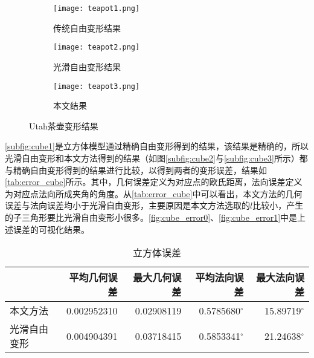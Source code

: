 \begin{figure}[htbp]
	\centering
	\begin{subfigure}[b]{.3\textwidth}
		\centering
		\texttt{[image: teapot1.png]}
		\caption{传统自由变形结果}\label{subfig:teapot1}
	\end{subfigure}
	\begin{subfigure}[b]{.3\textwidth}
		\centering
		\texttt{[image: teapot2.png]}
		\caption{光滑自由变形结果}\label{subfig:teapot2}
	\end{subfigure}
	\begin{subfigure}[b]{.3\textwidth}
		\centering
		\texttt{[image: teapot3.png]}
		\caption{本文结果}\label{subfig:teapot3}
	\end{subfigure}
	\caption{Utah茶壶变形结果}\label{fig:teapot_result}
\end{figure}

\autoref{subfig:cube1}是立方体模型通过精确自由变形得到的结果，该结果是精确的，所以光滑自由变形和本文方法得到的结果（如图\autoref{subfig:cube2}与\autoref{subfig:cube3}所示）都与精确自由变形得到的结果进行比较，以得到两者的变形误差，结果如\autoref{tab:error_cube}所示。其中，几何误差定义为对应点的欧氏距离，法向误差定义为对应点法向所成夹角的角度。从\autoref{tab:error_cube}中可以看出，本文方法的几何误差与法向误差均小于光滑自由变形，主要原因是本文方法选取的$l$比较小，产生的子三角形要比光滑自由变形小很多。\autoref{fig:cube_error0}、\autoref{fig:cube_error1}中是上述误差的可视化结果。

\begin{table}[htbp]
    \centering
    \caption{立方体误差} \label{tab:error_cube}
    \begin{tabular}{lrrrr}
    \toprule
                    & 平均几何误差 & 最大几何误差 & 平均法向误差 & 最大法向误差 \\
    \midrule
        本文方法    & \num{0.002952310} & \num{0.02908119} & \num[scientific-notation=false]{0.5785680}$^\circ$ & \num[scientific-notation=false]{15.89719}$^\circ$ \\
        光滑自由变形& \num{0.004904391} & \num{0.03718415} & \num[scientific-notation=false]{0.5853341}$^\circ$ & \num[scientific-notation=false]{21.24638}$^\circ$ \\
    \bottomrule
    \end{tabular}
\end{table}


